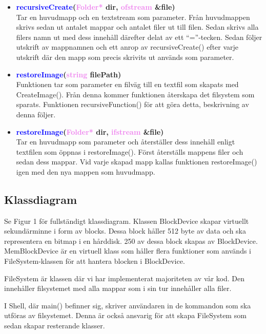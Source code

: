 \documentclass[a4paper,11pt]{article}
\newcommand{\colorFunction}[1]{\textcolor{blue}{#1}}
\newcommand{\colorType}[1]{\textcolor{violet}{#1}}
\begin{document}
\begin{itemize}
\item \textbf{\colorFunction{recursiveCreate}(\colorType{Folder*} dir, \colorType{ofstream} \&file)} \\
Tar en huvudmapp och en textstream som parameter. Från huvudmappen skrivs sedan ut antalet mappar och antalet filer ut till filen. Sedan skrivs alla filers namn ut med dess innehåll därefter delat av ett “=”-tecken. Sedan följer utskrift av mappnamnen och ett anrop av recursiveCreate() efter varje utskrift där den mapp som precis skrivits ut används som parameter.

\item \textbf{\colorFunction{restoreImage}(\colorType{string} filePath)} \\
Funktionen tar som parameter en filväg till en textfil som skapats med CreateImage(). Från denna kommer funktionen återskapa det filsystem som sparats. Funktionen recursiveFunction() för att göra detta, beskrivning av denna följer.

\item \textbf{\colorFunction{restoreImage}(\colorType{Folder*} dir, \colorType{ifstream} \&file)} \\
Tar en huvudmapp som parameter och återställer dess innehåll enligt textfilen som öppnas i restoreImage(). Först återställs mappens filer och sedan dess mappar. Vid varje skapad mapp kallas funktionen restoreImage() igen med den nya mappen som huvudmapp.
\end{itemize}
\subsection{Klassdiagram}
Se Figur 1 för fullständigt klassdiagram. Klassen BlockDevice skapar virtuellt sekundärminne i form av blocks. Dessa block håller 512 byte av data och ska representera en bitmap i en hårddisk. 250 av dessa block skapas av BlockDevice.
MemBlockDevice är en virtuell klass som håller flera funktioner som används i FileSystem-klassen för att hantera blocken i BlockDevice.

FileSystem är klassen där vi har implementerat majoriteten av vår kod. Den innehåller filsystemet med alla mappar som i sin tur innehåller alla filer.

I Shell, där main() befinner sig, skriver användaren in de kommandon som ska utföras av filsystemet. Denna är också ansvarig för att skapa FileSystem som sedan skapar resterande klasser.
\end{document}
